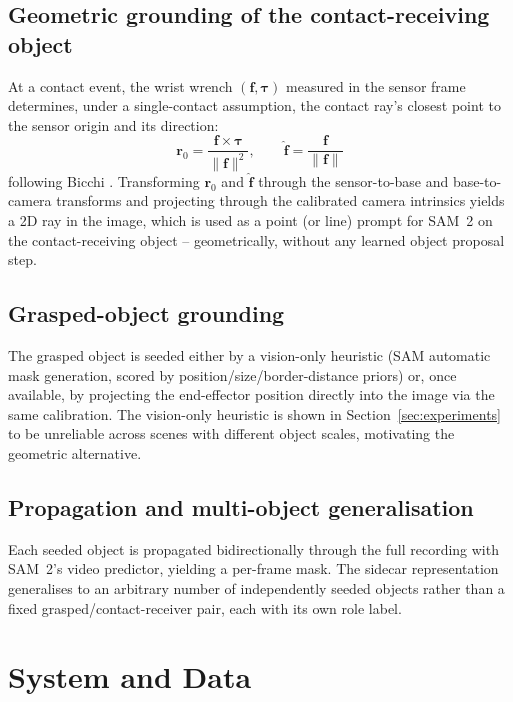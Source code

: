 \documentclass[letterpaper, 10pt, journal, twoside]{IEEEtran}
\begin{document}
\subsection{Geometric grounding of the contact-receiving object}

At a contact event, the wrist wrench $(\mathbf{f}, \boldsymbol{\tau})$
measured in the sensor frame determines, under a single-contact
assumption, the contact ray's closest point to the sensor origin and its
direction:
\begin{equation}
  \mathbf{r}_0 = \frac{\mathbf{f} \times \boldsymbol{\tau}}{\lVert \mathbf{f} \rVert^2}, \qquad
  \hat{\mathbf{f}} = \frac{\mathbf{f}}{\lVert \mathbf{f} \rVert}
  \label{eq:bicchi}
\end{equation}
following Bicchi \cite{bicchi1990}. Transforming $\mathbf{r}_0$ and
$\hat{\mathbf{f}}$ through the sensor-to-base and base-to-camera
transforms and projecting through the calibrated camera intrinsics
yields a 2D ray in the image, which is used as a point (or line) prompt
for SAM~2 on the contact-receiving object -- geometrically, without any
learned object proposal step.

\subsection{Grasped-object grounding}

The grasped object is seeded either by a vision-only heuristic (SAM
automatic mask generation, scored by position/size/border-distance
priors) or, once available, by projecting the end-effector position
directly into the image via the same calibration. The vision-only
heuristic is shown in Section~\ref{sec:experiments} to be unreliable
across scenes with different object scales, motivating the geometric
alternative.

\subsection{Propagation and multi-object generalisation}

Each seeded object is propagated bidirectionally through the full
recording with SAM~2's video predictor, yielding a per-frame mask. The
sidecar representation generalises to an arbitrary number of
independently seeded objects rather than a fixed grasped/contact-receiver
pair, each with its own role label.

\section{System and Data}
\end{document}
